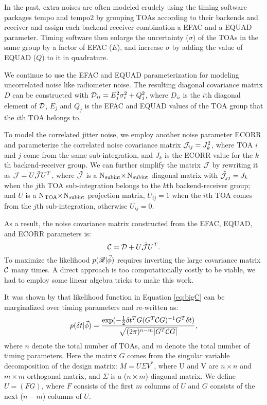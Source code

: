 {In the past, extra noises are often modeled crudely using the timing software
packages {\sc tempo} and {\sc tempo2} by grouping TOAs according to their backends 
and receiver and assign each backend-receiver combination a EFAC and a EQUAD
parameter. Timing software then enlarge the uncertainty ($\sigma$) of 
the TOAs in the same group by a factor of EFAC ($E$),
and increase $\sigma$ by adding the value of EQUAD ($Q$) to it in quadrature.

We continue to use the EFAC and EQUAD parameterization for modeling 
uncorrelated noise like radiometer noise. The resulting diagonal covariance
matrix $D$ can be constructed with $\mathcal{D}_{ii} = E_j^2\sigma_i^2 + Q_j^2$, where
$D_{ii}$ is the $i$th diagonal element of $\mathcal{D}$, $E_j$ and $Q_j$ is the
EFAC and EQUAD values of the TOA group that the $i$th TOA belongs to. 

To model the correlated jitter noise, we employ another noise
parameter ECORR and parameterize the correlated
noise covariance matrix $\mathcal{J}_{ij} = J_k^2$, where TOA $i$ and $j$ come from
the same sub-integration, and $J_k$ is the ECORR value for the $k$th backend-receiver group.
We can further simplify the matrix $\mathcal{J}$ by rewriting it as 
$\mathcal{J} = U \tilde{\mathcal{J}} U^{T}$, where $\tilde{\mathcal{J}}$ is a
N$_{\rm subint}\times$N$_{\rm subint}$ diagonal matrix with $\tilde{\mathcal{J}}_{jj} =
J_k$ when the $j$th TOA sub-integration belongs to the $k$th backend-receiver
group; and $U$ is a N$_{\rm TOA}\times$N$_{\rm subint}$ projection matrix,
$U_{ij} = 1$ when the $i$th TOA comes from the $j$th sub-integration, otherwise $U_{ij}=0$. 

As a result, the noise covariance matrix constructed from the EFAC, EQUAD, and
ECORR parameters is:
\begin{equation}
\label{eq:decom}
\mathcal{C} = \mathcal{D} + U \tilde{\mathcal{J}} U^{T}.
\end{equation}
To maximize the likelihood $p(\mathscr{R}|\vec \phi)$ requires inverting the large covariance 
matrix $\mathcal{C}$ many times. A direct approach is too computationally costly to be viable, we had to employ some linear algebra tricks to make this work. 


It was shown by \citet{vl13} that likelihood function in Equation
\ref{eq:bigC} can be marginalized over timing parameters and re-written as:
\begin{equation}
\label{eq:Gintro}
p(\delta t|\vec \phi) = \frac{\exp(-\frac{1}{2}\delta t^TG(G^T \mathcal{C} G)^{-1}G^T\delta t)}
{\sqrt{(2\pi)^{n-m}|G^{T}\mathcal{C} G|}},
\end{equation}
where $n$ denote the total number of TOAs, and $m$ denote the total number of
timing parameters.
Here the matrix $G$ comes from the singular variable decomposition of the design
matrix: $M = U\Sigma V^*$, where U and V are $n\times n$ and $m\times m$ orthogonal
matrix, and $\Sigma$ is a ($n\times m$) diagonal matrix.
We define $U = (F G)$, where $F$ consists of the first $m$ columns of $U$ and
$G$ consists of the next ($n-m$) columns of $U$.

}
